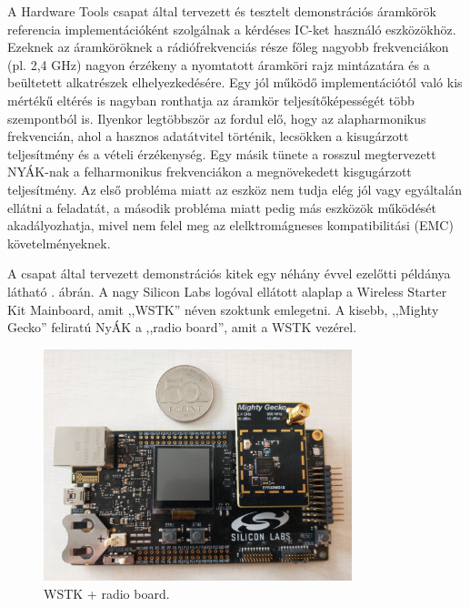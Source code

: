         \par
        A Hardware Tools csapat által tervezett és tesztelt demonstrációs áramkörök referencia implementációként szolgálnak a kérdéses IC-ket használó eszközökhöz. Ezeknek az áramköröknek a rádiófrekvenciás része főleg nagyobb frekvenciákon (pl. 2,4 GHz) nagyon érzékeny a nyomtatott áramköri rajz mintázatára és a beültetett alkatrészek elhelyezkedésére. Egy jól működő implementációtól való kis mértékű eltérés is nagyban ronthatja az áramkör teljesítőképességét több szempontból is. Ilyenkor legtöbbször az fordul elő, hogy az alapharmonikus frekvencián, ahol a hasznos adatátvitel történik, lecsökken a kisugárzott teljesítmény és a vételi érzékenység. Egy másik tünete a rosszul megtervezett NYÁK-nak a felharmonikus frekvenciákon a megnövekedett kisgugárzott teljesítmény. Az első probléma miatt az eszköz nem tudja elég jól vagy egyáltalán ellátni a feladatát, a második probléma miatt pedig más eszközök működését akadályozhatja, mivel nem felel meg az elelktromágneses kompatibilitási (EMC) követelményeknek.
        \par
        A csapat által tervezett demonstrációs kitek egy néhány évvel ezelőtti példánya látható . ábrán. A nagy Silicon Labs logóval ellátott alaplap a Wireless Starter Kit Mainboard, amit ,,WSTK'' néven szoktunk emlegetni. A kisebb, ,,Mighty Gecko'' feliratú NyÁK a ,,radio board'', amit a WSTK vezérel.
%
            \begin{figure}
                \centering
                \includegraphics[width=0.8\textwidth]{kep/szerkesztett/wstk-mighty-gecko-nagy.jpg}
                \caption{WSTK + radio board.}
                \label{fig:wstkmighty}
            \end{figure}
%
